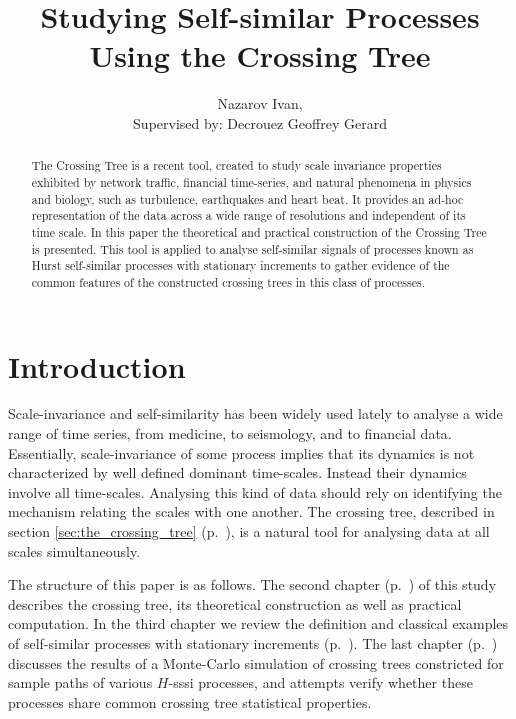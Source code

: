 \documentclass[a4paper]{article}
\title{Studying Self-similar Processes Using the Crossing Tree}
\author{Nazarov Ivan, \rus{101мНОД(ИССА)}\\
	{\small Supervised by: Decrouez Geoffrey Gerard}}
\begin{document}
\maketitle
\begin{abstract}
The Crossing Tree is a recent tool, created to study scale invariance properties
exhibited by network traffic, financial time-series, and natural phenomena in physics
and biology, such as turbulence, earthquakes and heart beat. It provides an ad-hoc
representation of the data across a wide range of resolutions and independent of
its time scale. In this paper the theoretical and practical construction of the Crossing
Tree is presented. This tool is applied to analyse self-similar signals of processes
known as Hurst self-similar processes with stationary increments to gather evidence 
of the common features of the constructed crossing trees in this class of processes.
\end{abstract}

\section{Introduction} %
\label{sec:introduction}

Scale-invariance and self-similarity has been widely used lately to analyse a wide
range of time series, from medicine, to seismology, and to financial data.
Essentially, scale-invariance of some process implies that its dynamics is not
characterized by well defined dominant time-scales. Instead their dynamics
involve all time-scales. Analysing this kind of data should rely on identifying
the mechanism relating the scales with one another. The crossing tree, described in
section \ref{sec:the_crossing_tree} (p.~\pageref{sec:the_crossing_tree}), is
a natural tool for analysing data at all scales simultaneously.

The structure of this paper is as follows. The second chapter (p.~\pageref{sec:the_crossing_tree})
of this study describes the crossing tree, its theoretical construction as well
as practical computation. In the third chapter we review the definition and classical
examples of self-similar processes with stationary increments (p.~\pageref{sec:h_sssi_processes}).
The last chapter (p.~\pageref{sec:the_crossing_tree_and_h_sssi_processes}) discusses
the results of a Monte-Carlo simulation of crossing trees constricted for sample
paths of various $H$-sssi processes, and attempts verify whether these processes
share common crossing tree statistical properties.
\end{document}
